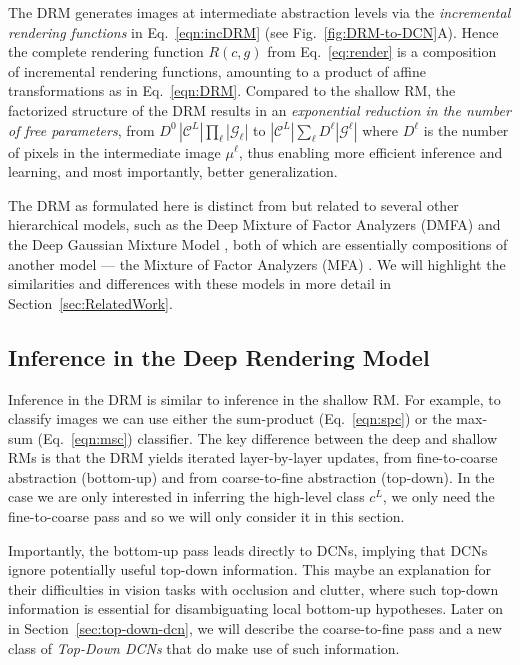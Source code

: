 \documentclass[12pt]{article}
\newcommand{\Cl}[0]{{ \mathcal{C} }}
\newcommand{\G}[0]{{ \mathcal{G} }}
\begin{document}
The DRM generates images at intermediate abstraction levels via the {\em incremental rendering functions} in Eq.~\ref{eqn:incDRM} (see Fig.~\ref{fig:DRM-to-DCN}A). Hence the complete rendering function $R(c,g)$ from Eq.~\ref{eq:render} is a composition of incremental rendering functions, amounting to a product of affine transformations as in Eq.~\ref{eqn:DRM}. Compared to the shallow RM, the factorized structure of the DRM results in an {\it exponential reduction in the number of free parameters}, from $D^{0} \, |\Cl^{L} |\prod_{\ell}|\G_{\ell}|$ to $|\Cl^{L}|\sum_{\ell} D^{\ell} |\G^{\ell}|$ where $D^{\ell}$ is the number of pixels in the intermediate image $\mu^{\ell}$, thus enabling more efficient inference and learning, and most importantly, better generalization.

The DRM as formulated here is distinct from but related to several other hierarchical models, such as the Deep Mixture of Factor Analyzers (DMFA) \cite{tang2012deep} and the Deep Gaussian Mixture Model \cite{van2014factoring}, both of which are essentially compositions of another model --- the Mixture of Factor Analyzers (MFA) \cite{ghahramani1996algorithm}. We will highlight the similarities and differences with these models in more detail in Section~\ref{sec:RelatedWork}.


\subsection{Inference in the Deep Rendering Model} \label{sec:infDRM}

Inference in the DRM is similar to inference in the shallow RM. 
For example, to classify images we can use either the sum-product (Eq.~\ref{eqn:spc}) or the max-sum (Eq.~\ref{eqn:msc}) classifier. 
The key difference between the deep and shallow RMs is that the DRM yields iterated layer-by-layer updates, from fine-to-coarse abstraction (bottom-up) and from coarse-to-fine abstraction (top-down). 
In the case we are only interested in inferring the high-level class $c^{L}$, we only need the fine-to-coarse pass and so we will only consider it in this section. 

Importantly, the bottom-up pass leads directly to DCNs, implying that DCNs ignore potentially useful top-down information. This maybe an explanation for their difficulties in vision tasks with occlusion and clutter, where such top-down information is essential for disambiguating local bottom-up hypotheses. Later on in Section~\ref{sec:top-down-dcn}, we will describe the coarse-to-fine pass and a new class of {\em Top-Down DCNs} that do make use of such information.
\end{document}
